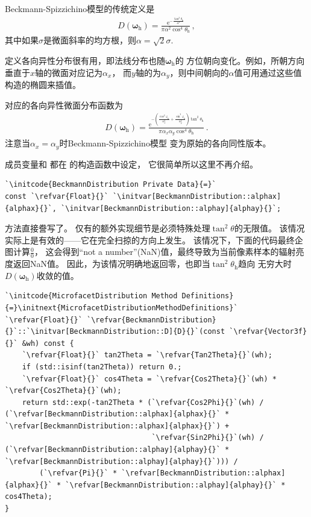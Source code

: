 Beckmann-Spizzichino模型的传统定义是
\begin{align}\label{eq:8.9}
    D({\bm\omega}_{\mathrm{h}})=\frac{\mathrm{e}^{-\frac{\tan^2\theta_{\mathrm{h}}}{\alpha^2}}}{\pi\alpha^2\cos^4\theta_{\mathrm{h}}}\, ,
\end{align}
其中如果$\sigma$是微面斜率的均方根，则$\alpha=\sqrt{2}\sigma$.

定义各向异性分布很有用，即法线分布也随${\bm\omega}_{\mathrm{h}}$的
方位朝向变化。例如，所朝方向垂直于$x$轴的微面对应记为$\alpha_x$，
而$y$轴的为$\alpha_y$，则中间朝向的$\alpha$值可用通过这些值构造的椭圆来插值。

对应的各向异性微面分布函数为
\begin{align}\label{eq:8.10}
    D({\bm\omega}_{\mathrm{h}})=\frac{\mathrm{e}^{-\left(\frac{\cos^2\varphi_{\mathrm{h}}}{\alpha_x^2}+\frac{\sin^2\varphi_{\mathrm{h}}}{\alpha_y^2}\right)\tan^2\theta_{\mathrm{h}}}}{\pi\alpha_x\alpha_y\cos^4\theta_{\mathrm{h}}}\, .
\end{align}
注意当$\alpha_x=\alpha_y$时Beckmann-Spizzichino模型
变为原始的各向同性版本。

成员变量和
都在
的构造函数中设定，
它很简单所以这里不再介绍。
\begin{lstlisting}
`\initcode{BeckmannDistribution Private Data}{=}`
const `\refvar{Float}{}` `\initvar[BeckmannDistribution::alphax]{alphax}{}`, `\initvar[BeckmannDistribution::alphay]{alphay}{}`;
\end{lstlisting}

方法直接誊写了。
仅有的额外实现细节是必须特殊处理$\tan^2\theta$的无限值。
该情况实际上是有效的——它在完全扫掠的方向上发生。
该情况下，下面的代码最终企图计算$\displaystyle\frac{0}{0}$，
这会得到“not a number”(NaN)值，最终导致为当前像素样本的辐射亮度返回NaN值。
因此，为该情况明确地返回零，也即当$\tan^2\theta_{\mathrm{h}}$趋向
无穷大时$D({\bm\omega}_{\mathrm{h}})$收敛的值。
\begin{lstlisting}
`\initcode{MicrofacetDistribution Method Definitions}{=}\initnext{MicrofacetDistributionMethodDefinitions}`
`\refvar{Float}{}` `\refvar{BeckmannDistribution}{}`::`\initvar[BeckmannDistribution::D]{D}{}`(const `\refvar{Vector3f}{}` &wh) const {
    `\refvar{Float}{}` tan2Theta = `\refvar{Tan2Theta}{}`(wh);
    if (std::isinf(tan2Theta)) return 0.;
    `\refvar{Float}{}` cos4Theta = `\refvar{Cos2Theta}{}`(wh) * `\refvar{Cos2Theta}{}`(wh);
    return std::exp(-tan2Theta * (`\refvar{Cos2Phi}{}`(wh) / (`\refvar[BeckmannDistribution::alphax]{alphax}{}` * `\refvar[BeckmannDistribution::alphax]{alphax}{}`) +
                                  `\refvar{Sin2Phi}{}`(wh) / (`\refvar[BeckmannDistribution::alphay]{alphay}{}` * `\refvar[BeckmannDistribution::alphay]{alphay}{}`))) /
        (`\refvar{Pi}{}` * `\refvar[BeckmannDistribution::alphax]{alphax}{}` * `\refvar[BeckmannDistribution::alphay]{alphay}{}` * cos4Theta);
}
\end{lstlisting}

